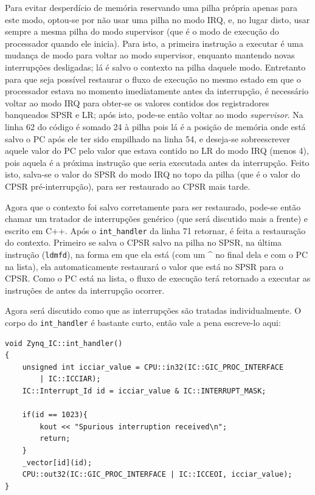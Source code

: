 Para evitar desperdício de memória reservando uma pilha própria apenas para este modo, optou-se por não usar uma pilha no modo IRQ, e, no lugar disto, usar sempre a mesma pilha do modo supervisor (que é o modo de execução do processador quando ele inicia). Para isto, a primeira instrução a executar é uma mudança de modo para voltar ao modo supervisor, enquanto mantendo novas interrupções desligadas; lá é salvo o contexto na pilha daquele modo. Entretanto para que seja possível restaurar o fluxo de execução no mesmo estado em que o processador estava no momento imediatamente antes da interrupção, é necessário voltar ao modo IRQ para obter-se os valores contidos dos registradores banqueados SPSR e LR; após isto, pode-se então voltar ao modo \emph{supervisor}. Na linha 62 do código é somado 24 à pilha pois lá é a posição de memória onde está salvo o PC após ele ter sido empilhado na linha 54, e deseja-se sobreescrever aquele valor do PC pelo valor que estava contido no LR do modo IRQ (menos 4), pois aquela é a próxima instrução que seria executada antes da interrupção. Feito isto, salva-se o valor do SPSR do modo IRQ no topo da pilha (que é o valor do CPSR pré-interrupção), para ser restaurado ao CPSR mais tarde.

Agora que o contexto foi salvo corretamente para ser restaurado, pode-se então chamar um tratador de interrupções genérico (que será discutido mais a frente) e escrito em C++. Após o \verb+int_handler+ da linha 71 retornar, é feita a restauração do contexto. Primeiro se salva o CPSR salvo na pilha no SPSR, na última instrução (\verb+ldmfd+), na forma em que ela está (com um \^{} no final dela e com o PC na lista), ela automaticamente restaurará o valor que está no SPSR para o CPSR. Como o PC está na lista, o fluxo de execução terá retornado a executar as instruções de antes da interrupção ocorrer.

Agora será discutido como que as interrupções são tratadas individualmente. O corpo do \verb+int_handler+ é bastante curto, então vale a pena escreve-lo aqui:

\begin{lstlisting}
void Zynq_IC::int_handler()
{	
    unsigned int icciar_value = CPU::in32(IC::GIC_PROC_INTERFACE 
        | IC::ICCIAR);
    IC::Interrupt_Id id = icciar_value & IC::INTERRUPT_MASK;

    if(id == 1023){
        kout << "Spurious interruption received\n";
        return;
    }
    _vector[id](id);
    CPU::out32(IC::GIC_PROC_INTERFACE | IC::ICCEOI, icciar_value);
}
\end{lstlisting}

